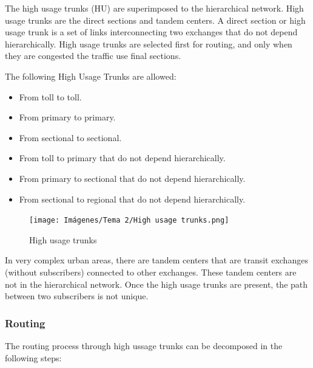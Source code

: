 \documentclass[
	12pt,
	twoside
]{book}
\begin{document}
The high usage trunks (HU) are superimposed to the hierarchical network. High usage trunks are
the direct sections and tandem centers. A direct section or high usage trunk is a set of links
interconnecting two exchanges that do not depend hierarchically. High usage trunks are selected
first for routing, and only when they are congested the traffic use final sections.

The following High Usage Trunks are allowed:

\begin{itemize}
	\item From toll to toll.
	\item From primary to primary.
	\item From sectional to sectional.
	\item From toll to primary that do not depend hierarchically.
	\item From primary to sectional that do not depend hierarchically.
	\item From sectional to regional that do not depend hierarchically.
\end{itemize}

\begin{figure}[H]
	\centering
	\texttt{[image: Imágenes/Tema 2/High usage trunks.png]}
	\caption{
		\label{fig:unit2_HU}
		High usage trunks
	}
\end{figure}

In very complex urban areas, there are tandem centers that are transit exchanges (without subscribers) connected to other exchanges. These tandem centers are not in the hierarchical network. Once the high usage trunks are present, the path between two subscribers is not unique.

\subsubsection{Routing}

The routing process through high ussage trunks can be decomposed in the following steps:
\end{document}
